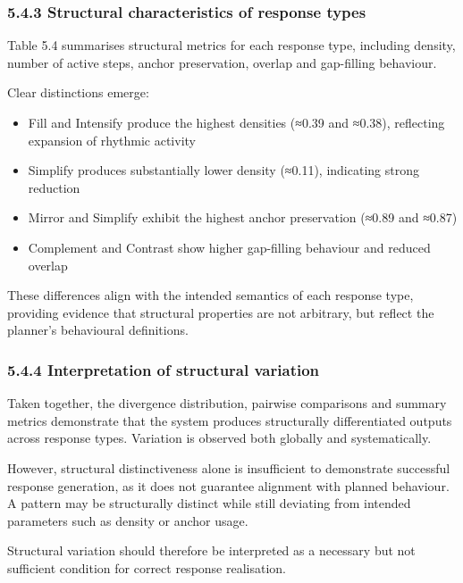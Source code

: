 \subsubsection{5.4.3 Structural characteristics of response
types}\label{structural-characteristics-of-response-types}

Table 5.4 summarises structural metrics for each response type,
including density, number of active steps, anchor preservation, overlap
and gap-filling behaviour.

Clear distinctions emerge:

\begin{itemize}
\item
  Fill and Intensify produce the highest densities (≈0.39 and ≈0.38),
  reflecting expansion of rhythmic activity
\item
  Simplify produces substantially lower density (≈0.11), indicating
  strong reduction
\item
  Mirror and Simplify exhibit the highest anchor preservation (≈0.89 and
  ≈0.87)
\item
  Complement and Contrast show higher gap-filling behaviour and reduced
  overlap
\end{itemize}

These differences align with the intended semantics of each response
type, providing evidence that structural properties are not arbitrary,
but reflect the planner's behavioural definitions.

\subsubsection{5.4.4 Interpretation of structural
variation}\label{interpretation-of-structural-variation}

Taken together, the divergence distribution, pairwise comparisons and
summary metrics demonstrate that the system produces structurally
differentiated outputs across response types. Variation is observed both
globally and systematically.

However, structural distinctiveness alone is insufficient to demonstrate
successful response generation, as it does not guarantee alignment with
planned behaviour. A pattern may be structurally distinct while still
deviating from intended parameters such as density or anchor usage.

Structural variation should therefore be interpreted as a necessary but
not sufficient condition for correct response realisation.

